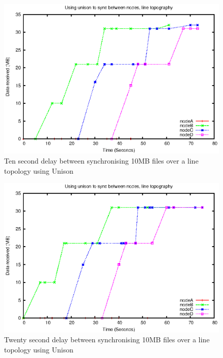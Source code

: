 \documentclass[12pt]{article}
\begin{document}
\begin{figure}[hb!]
\centering
\includegraphics[height=0.4\textheight]{images/line-uni-10-10.eps}
\caption{Ten second delay between synchronising 10MB files over a line topology
using Unison}
\label{fig:line_uni_10_10}
\end{figure}

\newpage
\begin{figure}[ht!]
\centering
\includegraphics[height=0.4\textheight]{images/line-uni-10-20.eps}
\caption{Twenty second delay between synchronising 10MB files over a line topology
using Unison}
\label{fig:line_uni_10_20}
\end{figure}
\end{document}
